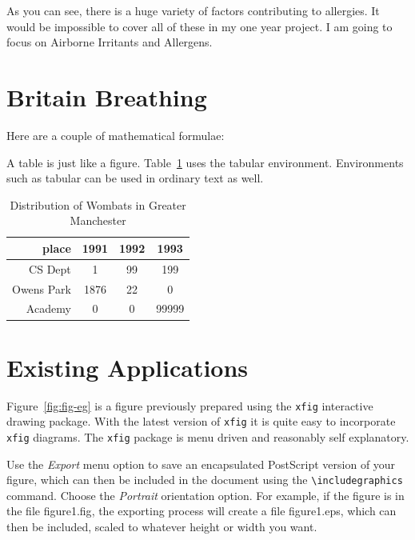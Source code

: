 As you can see, there is a huge variety of factors contributing to allergies. It would be impossible to cover all of these in my one year project. I am going to focus on Airborne Irritants and Allergens.


\section{Britain Breathing}



Here are a couple of mathematical formulae:


A table is just like a figure. Table~\ref{wombat} uses the tabular
environment.  Environments such as tabular can be used in ordinary
text as well.
\begin{table}
\begin{center}
\begin{tabular}{|r|c|c|c|}\hline\hline
place&1991&1992&1993\\\hline
CS Dept& 1&99&199\\
Owens Park& 1876& 22&0\\
Academy&0&0&99999\\\hline\hline
\end{tabular}
\end{center}
\caption{Distribution of Wombats in Greater Manchester}\label{wombat}
\end{table}


\section{Existing Applications}
\label{sec:diagrams}

Figure~\ref{fig:fig-eg} is a figure previously prepared using the
\texttt{xfig} interactive drawing package. With the latest version of
\texttt{xfig} it is quite easy to incorporate \texttt{xfig} diagrams.
The \texttt{xfig} package is menu driven and reasonably self
explanatory.

Use the \emph{Export} menu option to save an encapsulated PostScript
version of your figure, which can then be included in the document
using the \verb=\includegraphics= command. Choose the \emph{Portrait}
orientation option. For example, if the figure is in the file \textsf{
  figure1.fig}, the exporting process will create a file \textsf{
  figure1.eps}, which can then be included, scaled to whatever height
or width you want.


